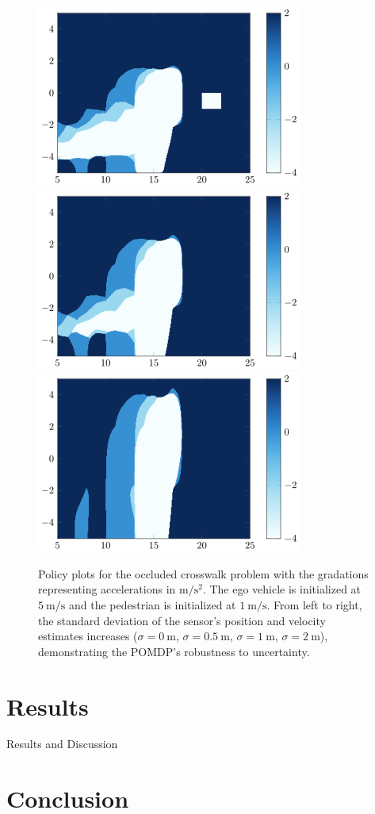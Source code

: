 \documentclass[conference]{IEEEtran}
\begin{document}
\begin{figure}[htbp]
{        \includegraphics[width=0.25\linewidth]{src/plots/qmdp_0_00001_noise_0_5_no_labels.png}
        \includegraphics[width=0.25\linewidth]{src/plots/qmdp_0_00001_noise_1_0_no_labels.png} \includegraphics[width=0.25\linewidth]{src/plots/qmdp_0_00001_noise_2_0_no_labels.png}
    }
    \caption{Policy plots for the occluded crosswalk problem with the gradations representing accelerations in $\si{\meter\per\square\second}$. The ego vehicle is initialized at $5 ~\si{\meter\per\second}$ and the pedestrian is initialized at $1 ~\si{\meter\per\second}$. From left to right, the standard deviation of the sensor's position and velocity estimates increases ($\sigma = 0~ \si{\meter}$, $\sigma = 0.5~ \si{\meter}$, $\sigma = 1~ \si{\meter}$, $\sigma = 2~ \si{\meter}$), demonstrating the POMDP's robustness to uncertainty.}
    \label{fig:qmdp}
\end{figure}

\section{Results}
\label{sec:results}


Results and Discussion

\section{Conclusion}
\label{sec:conclusion}

\end{document}
